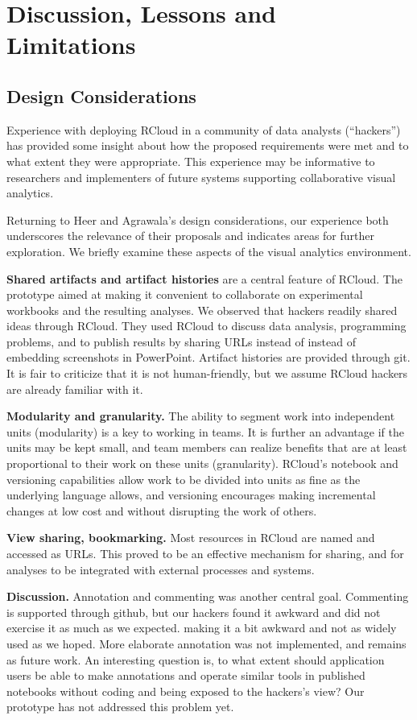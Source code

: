 \section{Discussion, Lessons and Limitations}
\label{sec:limitations}

\subsection{Design Considerations}

Experience with deploying RCloud in a community of data analysts
(``hackers'') has provided some insight about how the proposed
requirements were met and to what extent they were appropriate.
This experience may be informative to researchers and implementers
of future systems supporting collaborative visual analytics.

Returning to Heer and Agrawala's design considerations, our experience
both underscores the relevance of their proposals and indicates areas
for further exploration. We briefly examine these aspects of the
visual analytics environment.

{\bf Shared artifacts and artifact histories} are a central feature
of RCloud. The prototype aimed at making it convenient to collaborate
on experimental workbooks and the resulting analyses. We observed
that hackers readily shared ideas through RCloud. They used RCloud
to discuss data analysis, programming problems, and to publish results
by sharing URLs instead of instead of embedding screenshots in
PowerPoint. Artifact histories are provided through git. It is fair
to criticize that it is not human-friendly, but we assume RCloud
hackers are already familiar with it.

{\bf Modularity and granularity.} The ability to segment work into
independent units (modularity) is a key to working in teams. It is
further an advantage if the units may be kept small, and team members
can realize benefits that are at least proportional to their work
on these units (granularity). RCloud's notebook and versioning
capabilities allow work to be divided into units as fine as
the underlying language allows, and versioning encourages making
incremental changes at low cost and without disrupting the work
of others.

{\bf View sharing, bookmarking.} Most resources in RCloud are named
and accessed as URLs. This proved to be an effective mechanism for
sharing, and for analyses to be integrated with external processes
and systems.

{\bf Discussion.} Annotation and commenting was another central goal.
Commenting is supported through github, but our hackers found it
awkward and did not exercise it as much as we expected.
making it a bit awkward and
not as widely used as we hoped.  More elaborate annotation was not
implemented, and remains as future work.
An interesting question is, to what extent should application users
be able to make annotations and operate similar tools in published
notebooks without coding and being exposed to the hackers's view?
Our prototype has not addressed this problem yet.

